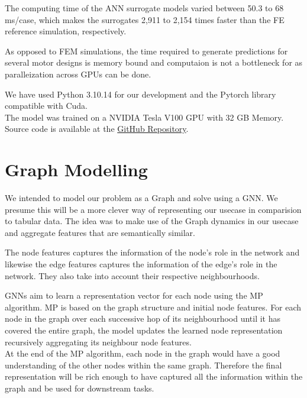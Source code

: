 \documentclass{report} %
\begin{document}
The computing time of the
ANN surrogate models varied between 50.3 to 68 ms/case,
which makes the surrogates 2,911 to 2,154 times faster than
the FE reference simulation, respectively.

As opposed to \ac{FEM} simulations, the time required to generate predictions for several motor designs is memory bound 
and computaion is not a bottleneck for as paralleization across GPUs can be done.

We have used Python 3.10.14 for our development and the Pytorch library compatible with Cuda.\\
The model was trained on a NVIDIA Tesla V100 \ac{GPU} with 32 GB Memory.\\
Source code is available at the \href{https://github.com/Lilly-25/Masters-Thesis}{GitHub Repository}.



\newpage 

\chapter{Graph Modelling} 

We intended to model our problem as a Graph and solve using a \ac{GNN}. 
We presume this will be a more clever way of representing our usecase in comparision to tabular data.
The idea was to make use of the Graph dynamics in our usecase and aggregate features that are semantically similar.

The node features captures the information of the node's role in the network and likewise the edge features captures the information of the edge's role in the network.
They also take into account their respective neighbourhoods.

\ac{GNN}s aim to learn a representation vector for each node using the \ac{MP} algorithm.
\ac{MP} is based on the graph structure and initial node features.
For each node in the graph over each successive hop of its neighbourhood until it has covered the entire graph, the model updates the learned node representation recursively aggregating its neighbour node features.\\
At the end of the \ac{MP} algorithm, each node in the graph would have a good understanding of the other nodes within the same graph.
Therefore the final representation will be rich enough to have captured all the information within the graph and be used for downstream tasks.\\
\end{document}
